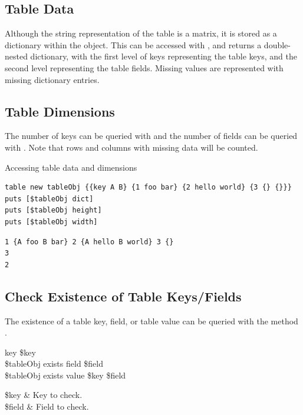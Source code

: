 \clearpage

\subsection{Table Data}
Although the string representation of the table is a matrix, it is stored as a dictionary within the object. This can be accessed with  , and returns a double-nested dictionary, with the first level of keys representing the table keys, and the second level representing the table fields. Missing values are represented with missing dictionary entries.
\begin{syntax}
\end{syntax}

\subsection{Table Dimensions}
The number of keys can be queried with  and the number of fields can be queried with . 
Note that rows and columns with missing data will be counted.
\begin{syntax}
\end{syntax}
\begin{syntax}
\end{syntax}

\begin{example}{Accessing table data and dimensions}
\begin{lstlisting}
table new tableObj {{key A B} {1 foo bar} {2 hello world} {3 {} {}}}
puts [$tableObj dict]
puts [$tableObj height]
puts [$tableObj width]
\end{lstlisting}
\tcblower
\begin{lstlisting}
1 {A foo B bar} 2 {A hello B world} 3 {}
3
2
\end{lstlisting}
\end{example}
\clearpage
\subsection{Check Existence of Table Keys/Fields}
The existence of a table key, field, or table value can be queried with the method . 
\begin{syntax}
 key \$key \\
\$tableObj exists field \$field \\
\$tableObj exists value \$key \$field
\end{syntax}
\begin{args}
\$key & Key to check. \\
\$field & Field to check.
\end{args}
